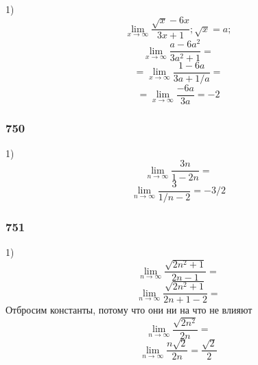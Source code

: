 \documentclass[12pt]{article}
\begin{document}
1)\\
$$
\lim_{x\to \infty} \frac{\sqrt{x}-6x}{3x+1} ;
\sqrt{x} = a;
$$
$$
\lim_{x\to \infty} \frac{a-6a^2}{3a^2+1}=
$$
$$
=\lim_{x\to \infty} \frac{1-6a}{3a+1/a} = 
$$
$$
=\lim_{x\to \infty} \frac{-6a}{3a} = -2
$$

\newpage
\subsubsection{750}

1)\\
$$
\lim_{n\to \infty} \frac{3n}{1-2n}=
$$
$$
\lim_{n\to \infty} \frac{3}{1/n-2}=-3/2
$$


\newpage
\subsubsection{751}

1)\\
$$
\lim_{n\to \infty} \frac{\sqrt{2n^2+1}}{2n-1}=
$$
$$
\lim_{n\to \infty} \frac{\sqrt{2n^2+1}}{2n+1-2}=
$$
Отбросим константы, потому что они ни на что не влияют
$$
\lim_{n\to \infty} \frac{\sqrt{2n^2}}{2n}=
$$
$$
\lim_{n\to \infty} \frac{n\sqrt{2}}{2n}=\frac{\sqrt{2}}{2}
$$
\end{document}
